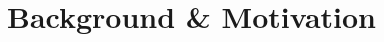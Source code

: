 \section{Background \& Motivation}
\label{sec:background}
\begin{figure}[t]
 \centering
 
 \vspace{-10pt}
 \caption{\CklstTemplateFigCaption}
 \label{code:TempEx}
 \vspace{-10pt}
\end{figure}


